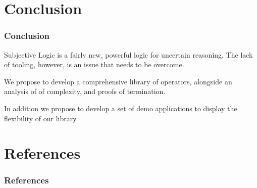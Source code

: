 \documentclass{beamer}
\begin{document}
%
%

\section{Conclusion}

\begin{frame}
\frametitle{Conclusion}

Subjective Logic is a fairly new, powerful logic for uncertain reasoning. The lack
of tooling, however, is an issue that needs to be overcome.

We propose to develop a comprehensive library of operators, alongside an analysis of
of complexity, and proofs of termination.

In addition we propose to develop a set of demo applications to display the flexibility
of our library.
\end{frame}


%
%

\section{References}

\begin{frame}[allowframebreaks]
\frametitle{References}




\end{frame}

\end{document}
